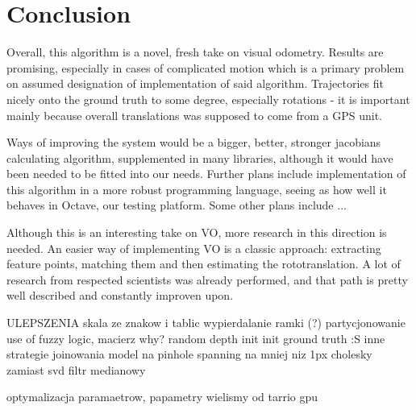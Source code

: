 \chapter{Conclusion}

Overall, this algorithm is a novel, fresh take on visual odometry. Results are promising, especially in cases of complicated motion which is a primary problem on assumed designation of implementation of said algorithm. Trajectories fit nicely onto the ground truth to some degree, especially rotations - it is important mainly because overall translations was supposed to come from a GPS unit.

Ways of improving the system would be a bigger, better, stronger jacobians calculating algorithm, supplemented in many libraries, although it would have been needed to be fitted into our needs. Further plans include implementation of this algorithm in a more robust programming language, seeing as how well it behaves in Octave, our testing platform. Some other plans include ...

Although this is an interesting take on VO, more research in this direction is needed. An easier way of implementing VO is a classic approach: extracting feature points, matching them and then estimating the rototranslation. A lot of research from respected scientists was already performed, and that path is pretty well described and constantly improven upon.


ULEPSZENIA
skala ze znakow i tablic
wypierdalanie ramki (?)
partycjonowanie
use of fuzzy logic, macierz why?
random depth init
init ground truth :S
inne strategie joinowania
model na pinhole
spanning na mniej niz 1px
cholesky zamiast svd
filtr medianowy





optymalizacja paramaetrow, papametry wielismy od tarrio
gpu

